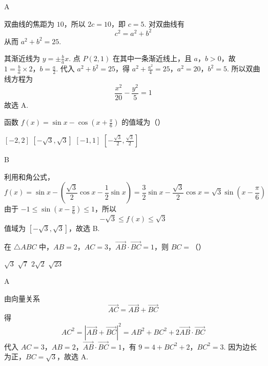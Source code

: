 \begin{answer}
A
\end{answer}

\begin{solution}
双曲线的焦距为 \(10\)，所以 \(2c=10\)，即 \(c=5\). 对双曲线有
\[
c^2=a^2+b^2
\]
从而 \(a^2+b^2=25\).

其渐近线为 \(y=\pm\frac ba x\). 点 \(P(2,1)\) 在其中一条渐近线上，且 \(a\)，\(b>0\)，故
\(1=\frac ba\times2\)，\(b=\frac a2\).
代入 \(a^2+b^2=25\)，得
\(a^2+\frac{a^2}{4}=25\)，\(a^2=20\)，\(b^2=5\).
所以双曲线方程为
\[
\frac{x^2}{20}-\frac{y^2}{5}=1
\]
故选 A.
\end{solution}

\begin{problem}
函数 \(f(x)=\sin x-\cos\left(x+\frac{\pi}{6}\right)\) 的值域为（\quad）

\choices
    {\([-2,2]\)}
    {\([-\sqrt{3},\sqrt{3}]\)}
    {\([-1,1]\)}
    {\(\left[-\frac{\sqrt{3}}{2},\frac{\sqrt{3}}{2}\right]\)}
\end{problem}

\begin{answer}
B
\end{answer}

\begin{solution}
利用和角公式，
\[
f(x)=\sin x-\left(\frac{\sqrt3}{2}\cos x-\frac12\sin x\right)=\frac32\sin x-\frac{\sqrt3}{2}\cos x=\sqrt3\sin\left(x-\frac\pi6\right)
\]
由于 \(-1\leqslant\sin\left(x-\frac\pi6\right)\leqslant1\)，所以
\[
-\sqrt3\leqslant f(x)\leqslant\sqrt3
\]
值域为 \([-\sqrt3,\sqrt3]\)，故选 B.
\end{solution}

\begin{problem}
在 \(\triangle ABC\) 中，\(AB=2\)，\(AC=3\)，\(\overrightarrow{AB}\cdot\overrightarrow{BC}=1\)，则 \(BC=\)（\quad）

\choices
    {\(\sqrt{3}\)}
    {\(\sqrt{7}\)}
    {\(2\sqrt{2}\)}
    {\(\sqrt{23}\)}
\end{problem}

\begin{answer}
A
\end{answer}

\begin{solution}
由向量关系
\[
\overrightarrow{AC}=\overrightarrow{AB}+\overrightarrow{BC}
\]
得
\[
AC^2=|\overrightarrow{AB}+\overrightarrow{BC}|^2
 =AB^2+BC^2+2\overrightarrow{AB}\cdot\overrightarrow{BC}
\]
代入 \(AC=3\)，\(AB=2\)，\(\overrightarrow{AB}\cdot\overrightarrow{BC}=1\)，有
\(9=4+BC^2+2\)，\(BC^2=3\).
因为边长为正，\(BC=\sqrt3\)，故选 A.
\end{solution}

